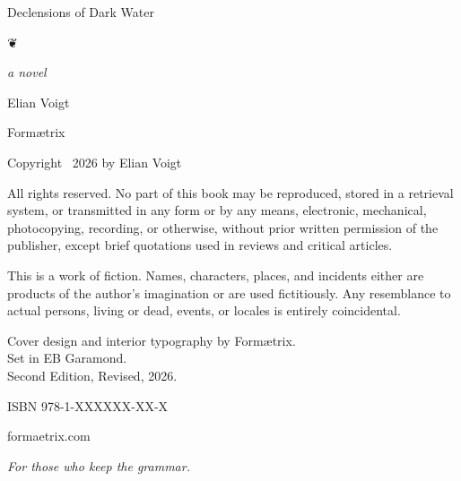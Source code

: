 \documentclass[11pt,oneside]{book}
\begin{document}
\frontmatter
\pagestyle{empty}

\begin{titlepage}
\centering
\ebgaramond
\vspace*{2.3in}
{\fontsize{24}{28}\selectfont{}Declensions of Dark Water\par}
\vspace{0.5in}
{\Large ❦\par}
\vspace{0.5in}
{\large\itshape a novel\par}
\vspace{1.1in}
{\Large Elian Voigt\par}
\vfill
{\small{}Form\ae trix\par}
\vspace*{0.6in}
\end{titlepage}

\newpage
\thispagestyle{empty}
\vspace*{1in}
\small
\noindent Copyright \textcopyright\ 2026 by Elian Voigt

\vspace{1em}
\noindent All rights reserved. No part of this book may be reproduced, stored in a retrieval system, or transmitted in any form or by any means, electronic, mechanical, photocopying, recording, or otherwise, without prior written permission of the publisher, except brief quotations used in reviews and critical articles.

\vspace{1em}
\noindent This is a work of fiction. Names, characters, places, and incidents either are products of the author's imagination or are used fictitiously. Any resemblance to actual persons, living or dead, events, or locales is entirely coincidental.

\vspace{1em}
\noindent Cover design and interior typography by Form\ae trix.\\
Set in EB Garamond.\\
Second Edition, Revised, 2026.

\vspace{1em}
\noindent ISBN 978-1-XXXXXX-XX-X

\vspace{1em}
\noindent formaetrix.com

\newpage
\thispagestyle{empty}
\vspace*{2.6in}
\begin{center}
\itshape
For those who keep the grammar.
\end{center}
\end{document}
